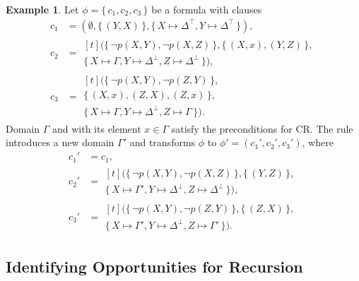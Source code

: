 \documentclass[letterpaper]{article} %
\theoremstyle{definition}
\newtheorem{example}{Example}
\begin{document}
\begin{example}
  Let $\phi = \{\, c_1, c_2, c_3 \,\}$ be a formula with clauses
  \begin{align*}
    c_1 &= (\emptyset, \{\, (Y, X) \,\}, \{\, X \mapsto \Delta^\top, Y \mapsto \Delta^\top \,\}), \\
    c_2 &=
          \begin{multlined}[t]
            (\{\, \neg p(X, Y), \neg p(X, Z) \,\}, \{\, (X, x), (Y, Z) \,\}, \\
            \{\, X \mapsto \Gamma, Y \mapsto \Delta^\bot, Z \mapsto \Delta^\bot \,\}),
          \end{multlined}\\
    c_3 &=
          \begin{multlined}[t]
            (\{\, \neg p(X, Y), \neg p(Z, Y) \,\}, \\
            \{\, (X, x), (Z, X), (Z, x) \,\}, \\
            \{\, X \mapsto \Gamma, Y \mapsto \Delta^\bot, Z \mapsto \Gamma \,\}).
          \end{multlined}
  \end{align*}
  Domain $\Gamma$ and with its element $x \in \Gamma$ satisfy the preconditions
  for CR\@. The rule introduces a new domain $\Gamma'$ and transforms $\phi$ to
  $\phi' = (c_1', c_2', c_3')$, where
  \begin{align*}
    c_1' &= c_1, \\
    c_2' &=
           \begin{multlined}[t]
             (\{\, \neg p(X, Y), \neg p(X, Z) \,\}, \{\, (Y, Z) \,\}, \\
             \{\, X \mapsto \Gamma', Y \mapsto \Delta^\bot, Z \mapsto \Delta^\bot \,\}),
           \end{multlined} \\
    c_3' &=
           \begin{multlined}[t]
             (\{\, \neg p(X, Y), \neg p(Z, Y) \,\}, \{\, (Z, X) \,\}, \\
             \{\, X \mapsto \Gamma', Y \mapsto \Delta^\bot, Z \mapsto \Gamma' \,\}).
           \end{multlined}
  \end{align*}
\end{example}

\subsection{Identifying Opportunities for Recursion}\label{sec:ref}
\end{document}
